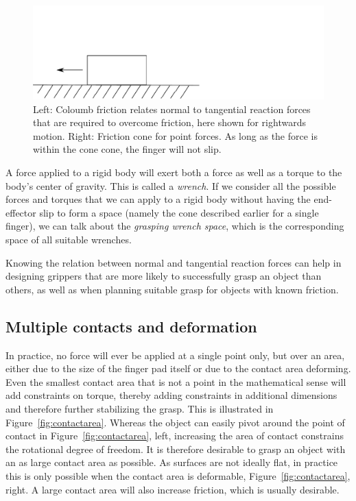\begin{figure}
\includegraphics[width=\columnwidth]{figs/coulombfriction}
\caption{Left: Coloumb friction relates normal to tangential reaction forces that are required to overcome friction, here shown for rightwards motion. Right: Friction cone for point forces. As long as the force is within the cone cone, the finger will not slip.} 
\end{figure}

A force applied to a rigid body will exert both a force as well as a torque to the body's center of gravity. This is called a \emph{wrench}. If we consider all the possible forces and torques that we can apply to a rigid body without having the end-effector slip to form a space (namely the cone described earlier for a single finger), we can talk about the \emph{grasping wrench space}, which is the corresponding space of all suitable wrenches.

Knowing the relation between normal and tangential reaction forces can help in designing grippers that are more likely to successfully grasp an object than others, as well as when planning suitable grasp for objects with known friction.


\subsection{Multiple contacts and deformation}
In practice, no force will ever be applied at a single point only, but over an area, either due to the size of the finger pad itself or due to the contact area deforming. Even the smallest contact area that is not a point in the mathematical sense will add constraints on torque, thereby adding constraints in additional dimensions and therefore further stabilizing the grasp. This is illustrated in Figure~\ref{fig:contactarea}. Whereas the object can easily pivot around the point of contact in Figure~\ref{fig:contactarea}, left, increasing the area of contact constrains the rotational degree of freedom. It is therefore desirable to grasp an object with an as large contact area as possible. As surfaces are not ideally flat, in practice this is only possible when the contact area is deformable, Figure~\ref{fig:contactarea}, right. A large contact area will also increase friction, which is usually desirable.

